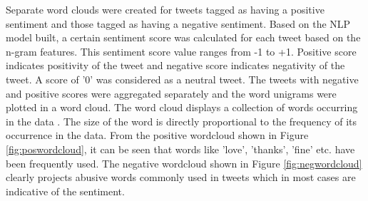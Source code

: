 \documentclass[9pt,twocolumn,twoside]{styles/osajnl}
\begin{document}
\begin{itemize}
    Separate word clouds were created for tweets tagged as having a positive sentiment and those tagged as having a negative sentiment. Based on the NLP model built, a certain sentiment score was calculated for each tweet based on the n-gram features. This sentiment score value ranges from -1 to +1. Positive score indicates positivity of the tweet and negative score indicates negativity of the tweet. A score of '0' was considered as a neutral tweet. The tweets with negative and positive scores were aggregated separately and the word unigrams were plotted in a word cloud. The word cloud displays a collection of words occurring in the data \cite{www-wordcloud}. The size of the word is directly proportional to the frequency of its occurrence in the data. From the positive wordcloud shown in Figure \ref{fig:poswordcloud}, it can be seen that words like 'love', 'thanks', 'fine' etc. have been frequently used. The negative wordcloud shown in Figure \ref{fig:negwordcloud} clearly projects abusive words commonly used in tweets which in most cases are indicative of the sentiment.     
\end{itemize}
\end{document}
